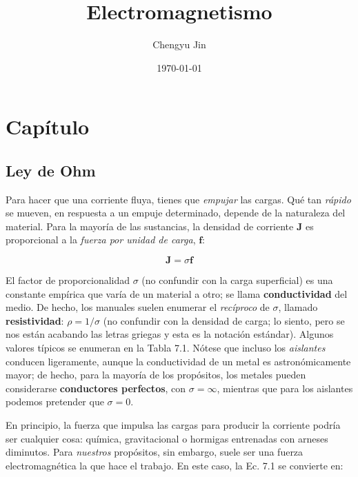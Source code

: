 \documentclass[12pt,a4paper]{report}
\title{Electromagnetismo}
\author{Chengyu Jin}
\date{\today}
\newcommand{\esp}{\vspace{0.5cm}}
\begin{document}
	
	\maketitle
	
	\tableofcontents
	\newpage
	
	\chapter{Capítulo}
	
	\section{Ley de Ohm}
	
	Para hacer que una corriente fluya, tienes que \textit{empujar} las cargas. Qué tan \textit{rápido} se mueven, en respuesta a un empuje determinado, depende de la naturaleza del material. Para la mayoría de las sustancias, la densidad de corriente $\mathbf{J}$ es proporcional a la \textit{fuerza por unidad de carga}, $\mathbf{f}$:
	
	\esp
	
	\begin{equation}
		\mathbf{J} = \sigma \mathbf{f} \tag{7.1}
	\end{equation}
	
	\esp
	
	El factor de proporcionalidad $\sigma$ (no confundir con la carga superficial) es una constante empírica que varía de un material a otro; se llama \textbf{conductividad} del medio. De hecho, los manuales suelen enumerar el \textit{recíproco} de $\sigma$, llamado \textbf{resistividad}: $\rho = 1/\sigma$ (no confundir con la densidad de carga; lo siento, pero se nos están acabando las letras griegas y esta es la notación estándar). Algunos valores típicos se enumeran en la Tabla 7.1. Nótese que incluso los \textit{aislantes} conducen ligeramente, aunque la conductividad de un metal es astronómicamente mayor; de hecho, para la mayoría de los propósitos, los metales pueden considerarse \textbf{conductores perfectos}, con $\sigma = \infty$, mientras que para los aislantes podemos pretender que $\sigma = 0$.
	
	\esp
	
	En principio, la fuerza que impulsa las cargas para producir la corriente podría ser cualquier cosa: química, gravitacional o hormigas entrenadas con arneses diminutos. Para \textit{nuestros} propósitos, sin embargo, suele ser una fuerza electromagnética la que hace el trabajo. En este caso, la Ec. 7.1 se convierte en:
	
\end{document}
